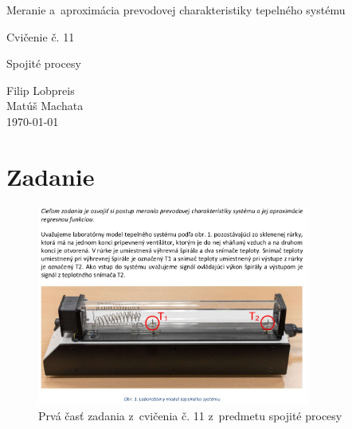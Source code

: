 \documentclass{article}
\begin{document}
\begin{titlepage}
	\null\vfill

	\begin{center}
		{\Huge Meranie a~aproximácia prevodovej charakteristiky tepelného systému }
		\vskip 2cm

		{\Large Cvičenie č. 11}
		\vskip 0.5cm

		{\large Spojité procesy}
	\end{center}

	\vfill
	\vfill

	\begin{flushright}
		Filip Lobpreis \\
		Matúš Machata \\
		\small\today\\
	\end{flushright}
	\hfill
\end{titlepage}

\thispagestyle{empty}
\clearpage

\tableofcontents
\thispagestyle{empty}
\clearpage

\section{Zadanie}
\label{sec:zadanie}

\begin{figure}[!htbp]
	\begin{center}
		\includegraphics[width=0.8\textwidth]{./include/zadanie.png}
	\end{center}
	\caption{Prvá časť zadania z~cvičenia č. 11 z~predmetu spojité procesy}
	\label{fig:zadanie1}
\end{figure}

\clearpage
\end{document}
